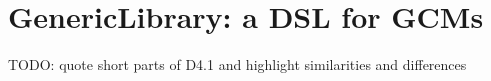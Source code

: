 \documentclass[]{article}
\begin{document}
\section{GenericLibrary: a DSL for GCMs}

TODO: quote short parts of D4.1 and highlight similarities and differences


%
%
%
%
%
\end{document}
